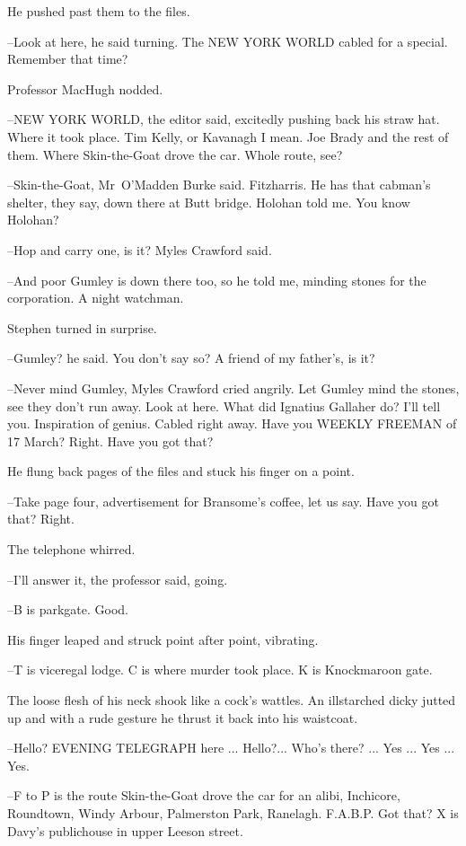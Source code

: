He pushed past them to the files.

--Look at here,
he said turning.
The NEW YORK WORLD cabled for a special.
Remember that time?

Professor MacHugh nodded.

--NEW YORK WORLD,
the editor said,
excitedly pushing back his straw hat.
Where it took place.
Tim Kelly, or Kavanagh I mean.
Joe Brady and the rest of them.
Where Skin-the-Goat drove the car.
Whole route, see?

--Skin-the-Goat,
Mr~O'Madden Burke said.
Fitzharris.
He has that cabman's shelter, they say,
down there at Butt bridge.
Holohan told me.
You know Holohan?

--Hop and carry one,
is it?
Myles Crawford said.

--And poor Gumley is down there too,
so he told me,
minding stones for the corporation.
A night watchman.

Stephen turned in surprise.

--Gumley?
he said.
You don't say so?
A friend of my father's,
is it?

--Never mind Gumley,
Myles Crawford cried angrily.
Let Gumley mind the stones,
see they don't run away.
Look at here.
What did Ignatius Gallaher do?
I'll tell you.
Inspiration of genius.
Cabled right away.
Have you WEEKLY FREEMAN of 17 March?
Right.
Have you got that?

He flung back pages of the files
and stuck his finger on a point.

--Take page four,
advertisement for Bransome's coffee,
let us say.
Have you got that?
Right.

The telephone whirred.



--I'll answer it,
the professor said,
going.

--B is parkgate.
Good.

His finger leaped and struck point after point,
vibrating.

--T is viceregal lodge.
C is where murder took place.
K is Knockmaroon gate.

The loose flesh of his neck shook like a cock's wattles.
An illstarched dicky jutted up
and with a rude gesture
he thrust it back into his waistcoat.

--Hello?
EVENING TELEGRAPH here ...
Hello?...
Who's there? ...
Yes ...
Yes ...
Yes.

--F to P is the route Skin-the-Goat drove the car for an alibi,
Inchicore, Roundtown, Windy Arbour, Palmerston Park, Ranelagh.
F.A.B.P.
Got that?
X is Davy's publichouse in upper Leeson street.

